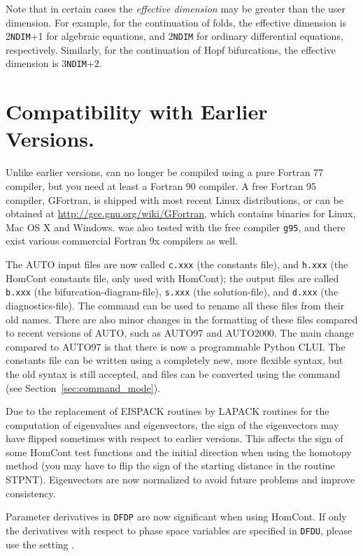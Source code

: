 \documentclass[12pt]{report}
\begin{document}
Note that in certain cases the {\it effective dimension} may be greater
than the user dimension.
For example, for the continuation of folds,
the effective dimension is 2{\tt NDIM}+1 for algebraic equations,
and 2{\tt NDIM} for ordinary differential equations, respectively.
Similarly, for the continuation of Hopf bifurcations,
the effective dimension is 3{\tt NDIM}+2.
 
 
\section{ Compatibility with Earlier Versions.} \label{sec:Compatibility}
Unlike earlier versions, \AUTO can no longer be compiled using a pure
Fortran 77 compiler, but you need at least a Fortran 90 compiler.
A free Fortran 95 compiler, GFortran, is shipped with most recent
Linux distributions, or can be obtained at
\url{http://gcc.gnu.org/wiki/GFortran}, which contains binaries for
Linux, Mac OS X and Windows. \AUTO was also tested with the free
compiler {\tt g95}, and there exist various commercial Fortran
9x compilers as well.

The {\cal AUTO} input files are now called 
{\tt c.xxx} (the constants file),
and
{\tt h.xxx} (the {\cal HomCont} constants file, only used with {\cal HomCont});
the output files are called
{\tt b.xxx} (the bifurcation-diagram-file),
{\tt s.xxx} (the solution-file),
and
{\tt d.xxx} (the diagnostics-file).
The command  can be used to rename all these files from
their old names.
There are also minor changes in the formatting of these files 
compared to recent versions of {\cal AUTO}, such as {\cal AUTO97} 
and {\cal AUTO2000}.
The main change compared to {\cal AUTO97} is that there is now a
programmable Python CLUI. The constants file can be written using
a completely new, more flexible syntax, but the old syntax is
still accepted, and files can be converted using the command
 (see Section~\ref{sec:command_mode}).

Due to the replacement of EISPACK routines by LAPACK routines for the
computation of eigenvalues and eigenvectors, the sign of the
eigenvectors may have flipped sometimes with respect to earlier
versions. This affects the sign of some {\cal HomCont}
test functions and the initial direction when using the homotopy
method (you may have to flip the sign of the starting distance
in the routine STPNT). Eigenvectors are now normalized to avoid
future problems and improve consistency.

Parameter derivatives in {\tt DFDP} are now significant when using {\cal
HomCont}. If only the derivatives with respect to phase space variables
are specified in {\tt DFDU}, please use the setting .
\end{document}

